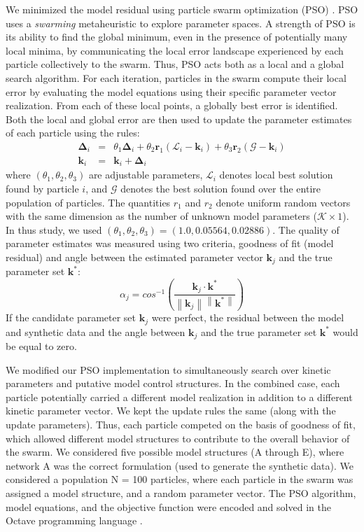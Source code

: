 \documentclass[12pt]{article}
\newcommand{\norm}[1]{\left\lVert#1\right\rVert}
\begin{document}
We minimized the model residual using particle swarm optimization (PSO) \citep{PSO}.
PSO uses a \textit{swarming} metaheuristic to explore parameter spaces. 
A strength of PSO is its ability to find the global minimum, even in the presence of potentially many local minima, by communicating the local
error landscape experienced by each particle collectively to the swarm. Thus, PSO acts both as a local and a global search algorithm. 
For each iteration, particles in the swarm compute their local error by evaluating the model equations using their specific parameter vector realization.
From each of these local points, a globally best error is identified. Both the local and global error 
are then used to update the parameter estimates of each particle using the rules:
\begin{eqnarray}
	\mathbf{\Delta}_{i} &=&\theta_{1}\mathbf{\Delta}_{i} + \theta_{2}\mathbf{r}_{1}\left(\mathcal{L}_{i} - \mathbf{k}_{i}\right) + \theta_{3}\mathbf{r}_{2}\left(\mathcal{G} - \mathbf{k}_{i}\right) \\
	\mathbf{k}_{i} &=& \mathbf{k}_{i} + \mathbf{\Delta}_{i}
\end{eqnarray}where $\left(\theta_{1},\theta_{2},\theta_{3}\right)$ are adjustable parameters, $\mathcal{L}_{i}$ denotes local best solution found by particle $i$, and
$\mathcal{G}$ denotes the best solution found over the entire population of particles. The quantities $r_{1}$ and $r_{2}$ denote uniform random vectors with the same dimension as the number of unknown model
parameters ($\mathcal{K}\times{1}$). In thus study, we used $\left(\theta_{1},\theta_{2},\theta_{3}\right) = \left(1.0, 0.05564, 0.02886\right)$. The quality of parameter
estimates was measured using two criteria, goodness of fit (model residual) and angle between the estimated parameter vector $\mathbf{k}_{j}$ and the true parameter set $\mathbf{k}^{*}$:
\begin{equation}
	\alpha_{j} = cos^{-1}\left(\frac{\mathbf{k}_{j}\cdot{\mathbf{k^{*}}}}{\norm{\mathbf{k}_{j}}\norm{\mathbf{k^{*}}}}\right)
\end{equation}If the candidate parameter set $\mathbf{k}_{j}$ were perfect, the residual between the model and synthetic data 
and the angle between $\mathbf{k}_{j}$ and the true parameter set $\mathbf{k}^{*}$ would be equal to zero.

We modified our PSO implementation to simultaneously search over kinetic parameters and putative model control structures.
In the combined case, each particle potentially carried a different model realization in addition to a different kinetic parameter vector. 
We kept the update rules the same (along with the update parameters). 
Thus, each particle competed on the basis of goodness of fit, which allowed different model structures to contribute to the overall behavior of the swarm. 
We considered five possible model structures (A through E), where network A was the correct formulation (used to generate the synthetic data). 
We considered a population N = 100 particles, where each particle in the swarm was assigned a model structure, and a random parameter vector.
The PSO algorithm, model equations, and the objective function were encoded and solved in the Octave programming language \citep{Octave:2014}.
\end{document}

